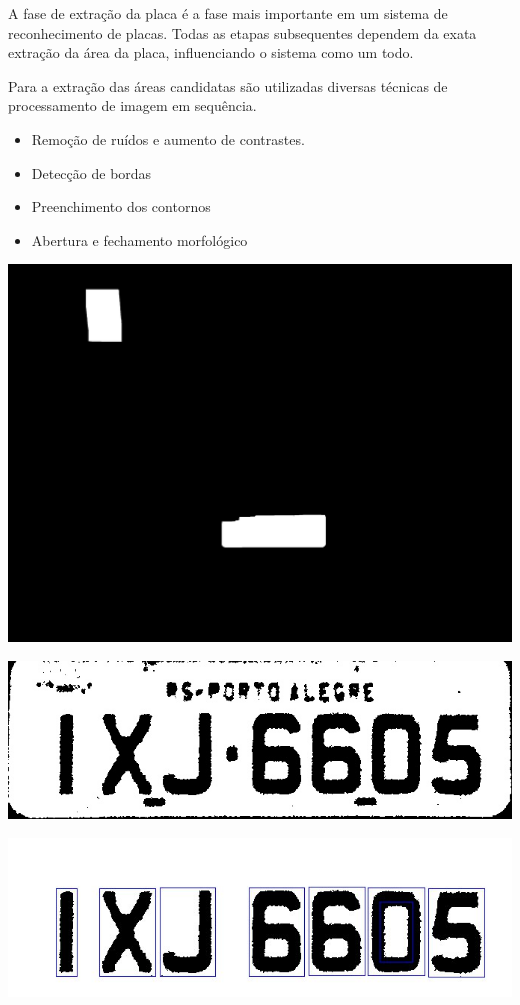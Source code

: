 \documentclass[a0,portrait]{a0poster}
\begin{document}
\begin{multicols}{2}
A fase de extração da placa é a fase mais importante em um sistema de reconhecimento de
placas. Todas as etapas subsequentes dependem da exata extração da área da
placa, influenciando o sistema como um todo.

Para a extração das áreas candidatas são utilizadas diversas técnicas de processamento de
imagem em sequência.

\begin{itemize}
	\item Remoção de ruídos e aumento de contrastes.
	\item Detecção de bordas
	\item Preenchimento dos contornos
	\item Abertura e fechamento morfológico
\end{itemize}

\begin{center}
	\includegraphics[width=0.70\linewidth]{9fill_dilated.jpg}
	\label{fig:fill_dilated}
\end{center}

\begin{center}
	\includegraphics[width=0.70\linewidth]{a02fill_binary.jpg}
	\label{fig:license_plate}
\end{center}

\begin{center}
	\includegraphics[width=0.70\linewidth]{character_segmentation.jpg}
	\label{fig:character_segmentation}
\end{center}


\end{multicols}
\end{document}
